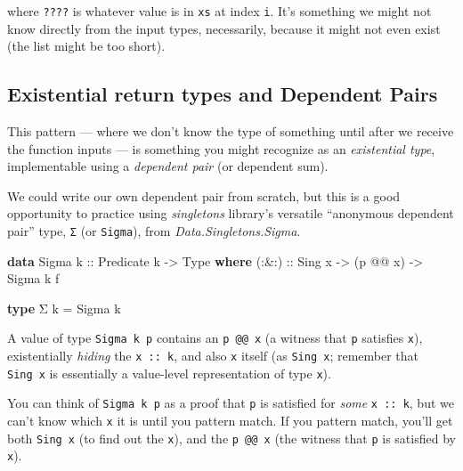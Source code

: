 \documentclass[]{article}
\newenvironment{Shaded}{}{}
\newcommand{\DataTypeTok}[1]{\textcolor[rgb]{0.56,0.13,0.00}{#1}}
\newcommand{\KeywordTok}[1]{\textcolor[rgb]{0.00,0.44,0.13}{\textbf{#1}}}
\newcommand{\NormalTok}[1]{#1}
\newcommand{\OperatorTok}[1]{\textcolor[rgb]{0.40,0.40,0.40}{#1}}
\newcommand{\OtherTok}[1]{\textcolor[rgb]{0.00,0.44,0.13}{#1}}
\begin{document}
where \texttt{????} is whatever value is in \texttt{xs} at index \texttt{i}.
It's something we might not know directly from the input types, necessarily,
because it might not even exist (the list might be too short).

\subsection{Existential return types and Dependent
Pairs}\label{existential-return-types-and-dependent-pairs}

This pattern --- where we don't know the type of something until after we
receive the function inputs --- is something you might recognize as an
\emph{existential type}, implementable using a \emph{dependent pair} (or
dependent sum).

We could write our own dependent pair from scratch, but this is a good
opportunity to practice using \emph{singletons} library's versatile ``anonymous
dependent pair'' type, \texttt{Σ} (or \texttt{Sigma}), from
\emph{Data.Singletons.Sigma}.

\begin{Shaded}
\begin{Highlighting}[]
\KeywordTok{data} \DataTypeTok{Sigma}\OtherTok{ k ::} \DataTypeTok{Predicate}\NormalTok{ k }\OtherTok{{-}\textgreater{}} \DataTypeTok{Type} \KeywordTok{where}
\OtherTok{    (:\&:) ::} \DataTypeTok{Sing}\NormalTok{ x }\OtherTok{{-}\textgreater{}}\NormalTok{ (p }\OperatorTok{@@}\NormalTok{ x) }\OtherTok{{-}\textgreater{}} \DataTypeTok{Sigma}\NormalTok{ k f}

\KeywordTok{type}\NormalTok{ Σ k }\OtherTok{=} \DataTypeTok{Sigma}\NormalTok{ k}
\end{Highlighting}
\end{Shaded}

A value of type \texttt{Sigma\ k\ p} contains an \texttt{p\ @@\ x} (a witness
that \texttt{p} satisfies \texttt{x}), existentially \emph{hiding} the
\texttt{x\ ::\ k}, and also \texttt{x} itself (as \texttt{Sing\ x}; remember
that \texttt{Sing\ x} is essentially a value-level representation of type
\texttt{x}).

You can think of \texttt{Sigma\ k\ p} as a proof that \texttt{p} is satisfied
for \emph{some} \texttt{x\ ::\ k}, but we can't know which \texttt{x} it is
until you pattern match. If you pattern match, you'll get both \texttt{Sing\ x}
(to find out the \texttt{x}), and the \texttt{p\ @@\ x} (the witness that
\texttt{p} is satisfied by \texttt{x}).
\end{document}
